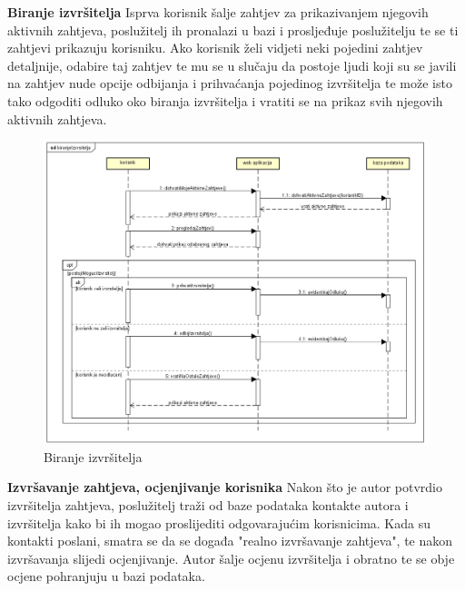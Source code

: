 				\noindent \large {\textbf{Biranje izvršitelja}}
				\newline
				\noindent \normalsize Isprva korisnik šalje zahtjev za prikazivanjem njegovih aktivnih zahtjeva, poslužitelj ih pronalazi u bazi i prosljeđuje poslužitelju te se ti zahtjevi prikazuju korisniku. Ako korisnik želi vidjeti neki pojedini zahtjev detaljnije, odabire taj zahtjev te mu se u slučaju da postoje ljudi koji su se javili na zahtjev nude opcije odbijanja i prihvaćanja pojedinog izvršitelja te može isto tako odgoditi odluko oko biranja izvršitelja i vratiti se na prikaz svih njegovih aktivnih zahtjeva. 
				   
				\newpage
				\begin{figure}[H]
					\includegraphics[scale=0.6]{slike/biranje-izvrsitelja.png} %
					\centering
					\caption{Biranje izvršitelja}
				\end{figure}
				\newpage
								
				\noindent \large {\textbf{Izvršavanje zahtjeva, ocjenjivanje korisnika}}
				\newline
				\noindent \normalsize Nakon što je autor potvrdio izvršitelja zahtjeva, poslužitelj traži od baze podataka kontakte autora i izvršitelja kako bi ih mogao proslijediti odgovarajućim korisnicima. Kada su kontakti poslani, smatra se da se događa "realno izvršavanje zahtjeva", te nakon izvršavanja slijedi ocjenjivanje. Autor šalje ocjenu izvršitelja i obratno te se obje ocjene pohranjuju u bazi podataka. 
				   
